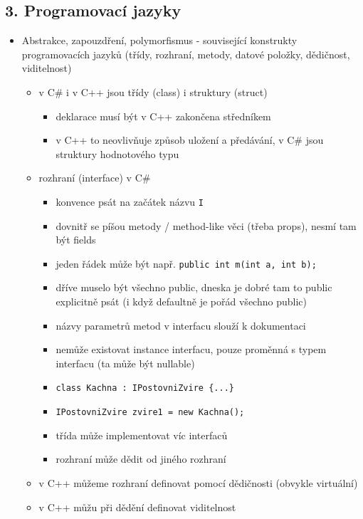 \subsection{3. Programovací jazyky}
\begin{itemize}
\item Abstrakce, zapouzdření, polymorfismus - související konstrukty programovacích jazyků (třídy, rozhraní, metody, datové položky, dědičnost, viditelnost)
\begin{itemize}
\item v C\# i v C++ jsou třídy (class) i struktury (struct)
\begin{itemize}
\item deklarace musí být v C++ zakončena středníkem
\item v C++ to neovlivňuje způsob uložení a předávání, v C\# jsou struktury hodnotového typu
\end{itemize}
\item rozhraní (interface) v C\#
\begin{itemize}
\item konvence psát na začátek názvu \texttt{I}
\item dovnitř se píšou metody / method-like věci (třeba props), nesmí tam být fields
\item jeden řádek může být např. \texttt{public \allowbreak{}int \allowbreak{}m(\allowbreak{}int \allowbreak{}a,\allowbreak{} \allowbreak{}int \allowbreak{}b)\allowbreak{};\allowbreak{}}
\item dříve muselo být všechno public, dneska je dobré tam to public explicitně psát (i když defaultně je pořád všechno public)
\item názvy parametrů metod v interfacu slouží k dokumentaci
\item nemůže existovat instance interfacu, pouze proměnná s typem interfacu (ta může být nullable)
\item \texttt{class \allowbreak{}Kachna \allowbreak{}: \allowbreak{}IPostovniZvire \allowbreak{}\{...\}\allowbreak{}}
\item \texttt{IPostovniZvire \allowbreak{}zvire1 \allowbreak{}= \allowbreak{}new \allowbreak{}Kachna(\allowbreak{})\allowbreak{};\allowbreak{}}
\item třída může implementovat víc interfaců
\item rozhraní může dědit od jiného rozhraní
\end{itemize}
\item v C++ můžeme rozhraní definovat pomocí dědičnosti (obvykle virtuální)
\item v C++ můžu při dědění definovat viditelnost

\end{itemize}
\end{itemize}

